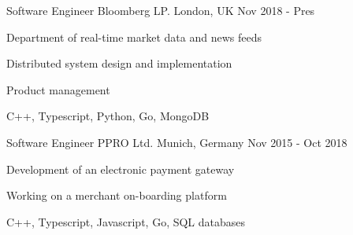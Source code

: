 

\begin{cventries}

  \cventry
    {Software Engineer} %
    {Bloomberg LP.} %
    {London, UK} %
    {Nov 2018 - Pres} %
    {
      \begin{cvitems} %
        \item {Department of real-time market data and news feeds}
        \item {Distributed system design and implementation}
        \item {Product management}
        \item {C++, Typescript, Python, Go, MongoDB}
      \end{cvitems}
    }
  \cventry
    {Software Engineer} %
    {PPRO Ltd.} %
    {Munich, Germany} %
    {Nov 2015 - Oct 2018} %
    {
      \begin{cvitems} %
        \item {Development of an electronic payment gateway}
        \item {Working on a merchant on-boarding platform}
        \item {C++, Typescript, Javascript, Go, SQL databases}
      \end{cvitems}
    }

\end{cventries}
